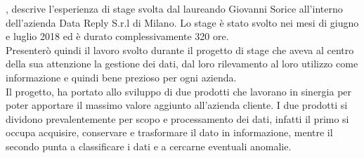 
, descrive	l'esperienza di stage svolta dal laureando Giovanni Sorice all'interno dell'azienda Data Reply S.r.l di Milano. Lo stage è stato svolto nei mesi di giugno e luglio 2018 ed è durato complessivamente 320 ore.
\\
Presenterò quindi il lavoro svolto durante il progetto di stage che aveva al centro della sua attenzione la gestione dei dati, dal loro rilevamento al loro utilizzo come informazione e quindi bene prezioso per ogni azienda.
\\
Il progetto, ha portato allo sviluppo di due prodotti che lavorano in sinergia per poter apportare il massimo valore aggiunto all'azienda cliente.
I due prodotti si dividono prevalentemente per scopo e processamento dei dati, infatti il primo si occupa acquisire, conservare e trasformare il dato in informazione, mentre il secondo punta a classificare i dati e a cercarne eventuali anomalie.

